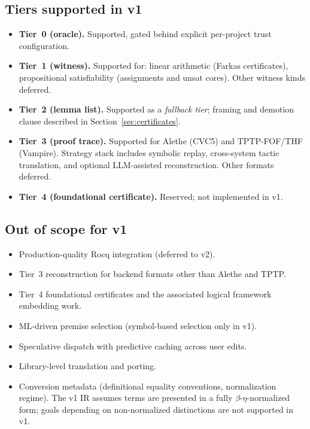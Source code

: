 \documentclass[11pt,letterpaper]{article}
\theoremstyle{definition}
\theoremstyle{remark}
\begin{document}
\subsection{Tiers supported in v1}

\begin{itemize}[leftmargin=2em]
  \item \textbf{Tier~0 (oracle).} Supported, gated behind explicit
        per-project trust configuration.
  \item \textbf{Tier~1 (witness).} Supported for: linear arithmetic
        (Farkas certificates), propositional satisfiability (assignments
        and unsat cores). Other witness kinds deferred.
  \item \textbf{Tier~2 (lemma list).} Supported as a \emph{fallback tier};
        framing and demotion clause described in Section~\ref{sec:certificates}.
  \item \textbf{Tier~3 (proof trace).} Supported for Alethe (CVC5) and
        TPTP-FOF/THF (Vampire). Strategy stack includes symbolic replay,
        cross-system tactic translation, and optional LLM-assisted
        reconstruction. Other formats deferred.
  \item \textbf{Tier~4 (foundational certificate).} Reserved; not
        implemented in v1.
\end{itemize}

\subsection{Out of scope for v1}

\begin{itemize}[leftmargin=2em]
  \item Production-quality Rocq integration (deferred to v2).
  \item Tier~3 reconstruction for backend formats other than Alethe and
        TPTP.
  \item Tier~4 foundational certificates and the associated logical
        framework embedding work.
  \item ML-driven premise selection (symbol-based selection only in v1).
  \item Speculative dispatch with predictive caching across user edits.
  \item Library-level translation and porting.
  \item Conversion metadata (definitional equality conventions, normalization
        regime). The v1 IR assumes terms are presented in a fully
        $\beta$-$\eta$-normalized form; goals depending on non-normalized
        distinctions are not supported in v1.
\end{itemize}
\end{document}
